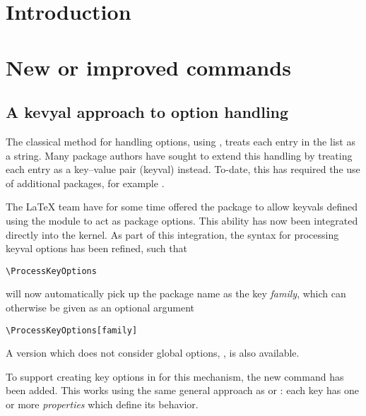 \documentclass{ltnews}
\providecommand\tubcommand[1]{}
\begin{document}
\tubcommand{\addtolength\textheight{4.2pc}}   %

\maketitle
{ \spaceskip=3.33pt  \tableofcontents}

\setlength{}


\medskip


\section{Introduction}


\section{New or improved commands}

\subsection{A kevyal approach to option handling}

The classical \LaTeXe{} method for handling options, using ,
treats each entry in the list as a string. Many package authors have sought to
extend this handling by treating each entry as a key--value pair (keyval)
instead. To-date, this has required the use of additional packages, for example
.

The \LaTeX{} team have for some time offered the package  to
allow keyvals defined using the  module  to act as
package options. This ability has now been integrated directly into the kernel.
As part of this integration, the syntax for processing keyval options has been
refined, such that
\begin{verbatim}
\ProcessKeyOptions
\end{verbatim}
will now automatically pick up the package name as the key \emph{family}, which
can otherwise be given as an optional argument
\begin{verbatim}
\ProcessKeyOptions[family]
\end{verbatim}
A version which does not consider global options,
, is also available.

To support creating key options in for this mechanism, the new command
 has been added. This works using the same general
approach as  or : each key has one or more
\emph{properties} which define its behavior.
\end{document}
